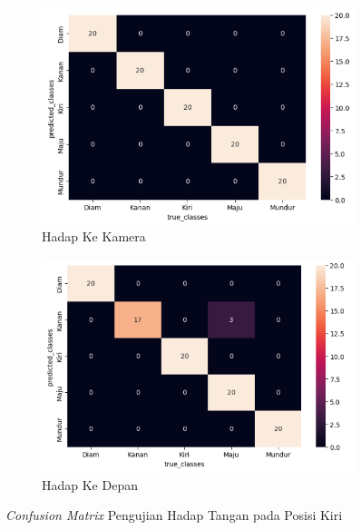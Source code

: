 \begin{enumerate}
  \begin{figure}[H]
    \centering
    \begin{subfigure}{0.7\textwidth}
      \centering
      \includegraphics[width=\linewidth]{../Gambar/cmkirihadapkamera.png}
      \caption{Hadap Ke Kamera}
      \label{fig:cmkanankamera}
    \end{subfigure}
    \begin{subfigure}{0.7\textwidth}
      \centering
      \includegraphics[width=\linewidth]{../Gambar/cmkirihadaplurus.png}
      \caption{Hadap Ke Depan}
      \label{fig:cmkananlurus}
    \end{subfigure}
    \centering
    \caption{\emph{Confusion Matrix} Pengujian Hadap Tangan pada Posisi Kiri}
    \label{fig:cmkiri}
  \end{figure}


\end{enumerate}
